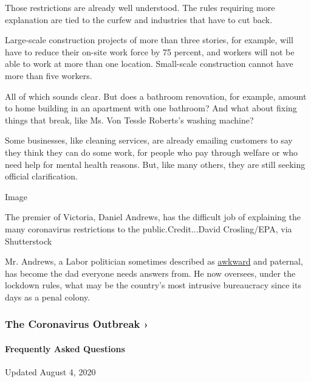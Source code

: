Those restrictions are already well understood. The rules requiring more
explanation are tied to the curfew and industries that have to cut back.

Large-scale construction projects of more than three stories, for
example, will have to reduce their on-site work force by 75 percent, and
workers will not be able to work at more than one location. Small-scale
construction cannot have more than five workers.

All of which sounds clear. But does a bathroom renovation, for example,
amount to home building in an apartment with one bathroom? And what
about fixing things that break, like Ms. Von Tessle Roberts's washing
machine?

Some businesses, like cleaning services, are already emailing customers
to say they think they can do some work, for people who pay through
welfare or who need help for mental health reasons. But, like many
others, they are still seeking official clarification.

Image

The premier of Victoria, Daniel Andrews, has the difficult job of
explaining the many coronavirus restrictions to the
public.Credit...David Crosling/EPA, via Shutterstock

Mr. Andrews, a Labor politician sometimes described as
\href{https://www.theage.com.au/national/victoria/the-strange-feeling-i-have-when-i-watch-daniel-andrews-20200710-p55av5.html}{awkward}
and paternal, has become the dad everyone needs answers from. He now
oversees, under the lockdown rules, what may be the country's most
intrusive bureaucracy since its days as a penal colony.

\href{https://www.nytimes3xbfgragh.onion/news-event/coronavirus?action=click\&pgtype=Article\&state=default\&region=MAIN_CONTENT_3\&context=storylines_faq}{}

\hypertarget{the-coronavirus-outbreak-}{%
\subsubsection{The Coronavirus Outbreak
›}\label{the-coronavirus-outbreak-}}

\hypertarget{frequently-asked-questions}{%
\paragraph{Frequently Asked
Questions}\label{frequently-asked-questions}}

Updated August 4, 2020

